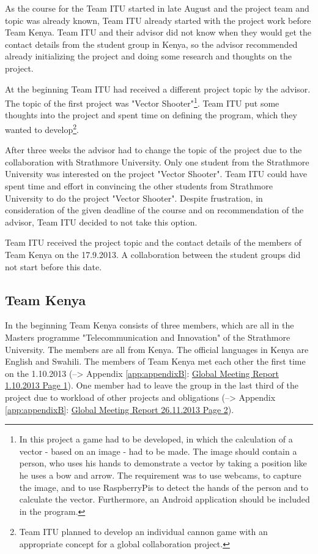 As the course for the Team ITU started in late August and the project team and topic was already known, Team ITU already started with the project work before Team Kenya. Team ITU and their advisor did not know when they would get the contact details from the student group in Kenya, so the advisor recommended already initializing the project and doing some research and thoughts on the project.

At the beginning Team ITU had received a different project topic by the advisor. The topic of the first project was "Vector Shooter"\footnote{In this project a game had to be developed, in which the calculation of a vector - based on an image - had to be made. The image should contain a person, who uses his hands to demonstrate a vector by taking a position like he uses a bow and arrow. The requirement was to use webcams, to capture the image, and to use RaspberryPis to detect the hands of the person and to calculate the vector. Furthermore, an Android application should be included in the program.}. Team ITU put some thoughts into the project and spent time on defining the program, which they wanted to develop\footnote{Team ITU planned to develop an individual cannon game with an appropriate concept for a global collaboration project.}.

After three weeks the advisor had to change the topic of the project due to the collaboration with Strathmore University. Only one student from the Strathmore University was interested on the project "Vector Shooter". Team ITU could have spent time and effort in convincing the other students from Strathmore University to do the project "Vector Shooter". Despite frustration, in consideration of the given deadline of the course and on recommendation of the advisor, Team ITU decided to not take this option.

Team ITU received the project topic and the contact details of the members of Team Kenya on the 17.9.2013. A collaboration between the student groups did not start before this date.


\subsection{Team Kenya}
\label{sec:team_Kenya}

In the beginning Team Kenya consists of three members, which are all in the Masters programme "Telecommunication and Innovation" of the Strathmore University. The members are all from Kenya. The official languages in Kenya are English and Swahili. The members of Team Kenya met each other the first time on the 1.10.2013 (--> Appendix \ref{app:appendixB}: \hyperlink{GSD20131001.1}{Global Meeting Report 1.10.2013 Page 1}). One member had to leave the group in the last third of the project due to workload of other projects and obligations (--> Appendix \ref{app:appendixB}: \hyperlink{GSD20131126.2}{Global Meeting Report 26.11.2013 Page 2}).


